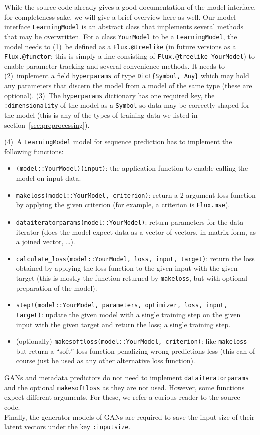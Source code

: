 While the source code already gives a good documentation of the model
interface, for completeness sake, we will give a brief overview here
as well. Our model interface \texttt{LearningModel} is an abstract
class that implements several methods that may be overwritten. For a
class \texttt{YourModel} to be a \texttt{LearningModel}, the model
needs to (1)~be defined as a \texttt{Flux.@treelike} (in future
versions as a \texttt{Flux.@functor}; this is simply a line consisting
of \texttt{Flux.@treelike YourModel}) to enable parameter tracking and
several convenience methods. It needs to (2)~implement a field
\texttt{hyperparams} of type \texttt{Dict\{Symbol, Any\}} which may
hold any parameters that discern the model from a model of the same
type (these are optional). (3)~The \texttt{hyperparams} dictionary has
one required key, the \texttt{:dimensionality} of the model as a
\texttt{Symbol} so data may be correctly shaped for the model (this is
any of the types of training data we listed in
section~\ref{sec:preprocessing}).

(4)~A \texttt{LearningModel} model for sequence prediction has to
implement the following functions:
\begin{itemize}
\item \texttt{(model::YourModel)(input)}: the application function to
  enable calling the model on input data.
\item \texttt{makeloss(model::YourModel, criterion)}: return a
  2-argument loss function by applying the given criterion (for
  example, a criterion is \texttt{Flux.mse}).
\item \texttt{dataiteratorparams(model::YourModel)}: return
  parameters for the data iterator (does the model expect data as a
  vector of vectors, in matrix form, as a joined vector, \dots).
\item \texttt{calculate\_loss(model::YourModel, loss, input, target)}:
  return the loss obtained by applying the loss function to the given
  input with the given target (this is mostly the function returned by
  \texttt{makeloss}, but with optional preparation of the model).
\item \texttt{step!(model::YourModel, parameters, optimizer, loss,
    input, target)}: update the given model with a single training
  step on the given input with the given target and return the loss; a
  single training step.
\item (optionally) \texttt{makesoftloss(model::YourModel, criterion)}:
  like \texttt{makeloss} but return a ``soft'' loss function
  penalizing wrong predictions less (this can of course just be used
  as any other alternative loss function).
\end{itemize}

GANs and metadata predictors do not need to implement
\texttt{dataiteratorparams} and the optional \texttt{makesoftloss} as
they are not used. However, some functions expect different arguments.
For these, we refer a curious reader to the source code. \\
Finally, the generator models of GANs are required to save the input
size of their latent vectors under the key \texttt{:inputsize}.

